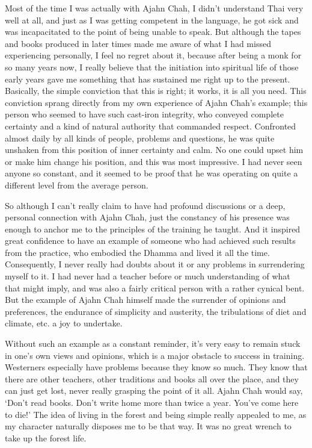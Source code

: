 Most of the time I was actually with Ajahn Chah, I didn't understand
Thai very well at all, and just as I was getting competent in the
language, he got sick and was incapacitated to the point of being unable
to speak. But although the tapes and books produced in later times made
me aware of what I had missed experiencing personally, I feel no regret
about it, because after being a monk for so many years now, I really
believe that the initiation into spiritual life of those early years
gave me something that has sustained me right up to the present.
Basically, the simple conviction that this is right; it works, it is all
you need. This conviction sprang directly from my own experience of
Ajahn Chah's example; this person who seemed to have such cast-iron
integrity, who conveyed complete certainty and a kind of natural
authority that commanded respect. Confronted almost daily by all kinds
of people, problems and questions, he was quite unshaken from this
position of inner certainty and calm. No one could upset him or make him
change his position, and this was most impressive. I had never seen
anyone so constant, and it seemed to be proof that he was operating on
quite a different level from the average person.

So although I can't really claim to have had profound discussions or a
deep, personal connection with Ajahn Chah, just the constancy of his
presence was enough to anchor me to the principles of the training he
taught. And it inspired great confidence to have an example of someone
who had achieved such results from the practice, who embodied the Dhamma
and lived it all the time. Consequently, I never really had doubts about
it or any problems in surrendering myself to it. I had never had a
teacher before or much understanding of what that might imply, and was
also a fairly critical person with a rather cynical bent. But the
example of Ajahn Chah himself made the surrender of opinions and
preferences, the endurance of simplicity and austerity, the tribulations
of diet and climate, etc. a joy to undertake.

Without such an example as a constant reminder, it's very easy to remain
stuck in one's own views and opinions, which is a major obstacle to
success in training. Westerners especially have problems because they
know so much. They know that there are other teachers, other traditions
and books all over the place, and they can just get lost, never really
grasping the point of it all. Ajahn Chah would say, `Don't read books.
Don't write home more than twice a year. You've come here to die!' The
idea of living in the forest and being simple really appealed to me, as
my character naturally disposes me to be that way. It was no great
wrench to take up the forest life.

